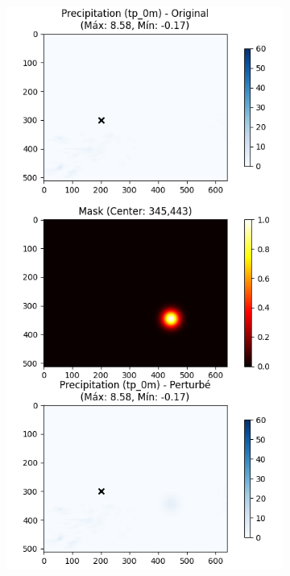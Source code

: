 \begin{figure}[h]
    \centering
    \begin{subfigure}[b]{0.32\textwidth}
        \includegraphics[width=\textwidth]{Images/titan_rain_perturbations/perturbed_c_tp_0m.png}

\end{subfigure}
\end{figure}
